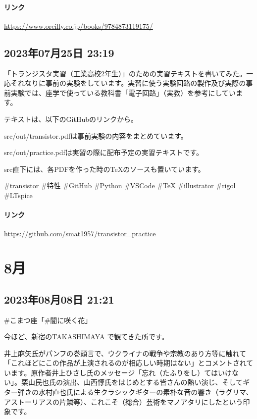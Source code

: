\documentclass[facebook_diary.tex]{subfiles}
\begin{document}
\paragraph{リンク}
\url{https://www.oreilly.co.jp/books/9784873119175/}

\subsection*{2023年07月25日 23:19}

「トランジスタ実習（工業高校2年生）」のための実習テキストを書いてみた。一応それなりに事前の実験をしています。実習に使う実験回路の製作及び実際の事前実験では、座学で使っている教科書「電子回路」（実教）を参考にしています。


テキストは、以下のGitHubのリンクから。


src/out/transistor.pdfは事前実験の内容をまとめています。

src/out/practice.pdfは実習の際に配布予定の実習テキストです。

src直下には、各PDFを作った時のTeXのソースも置いています。


\#transistor \#特性 \#GitHub \#Python \#VSCode \#TeX \#illustrator \#rigol \#LTspice

\paragraph{リンク}
\url{https://github.com/smat1957/transistor_practice}

\section{8月}

\subsection*{2023年08月08日 21:21}

\#こまつ座「\#闇に咲く花」


今ほど、新宿のTAKASHIMAYA で観てきた所です。

井上麻矢氏がパンフの巻頭言で、ウクライナの戦争や宗教のあり方等に触れて「これほどにこの作品が上演されるのが相応しい時期はない」とコメントされています。原作者井上ひさし氏のメッセージ「忘れ（たふりをし）てはいけない」。栗山民也氏の演出、山西惇氏をはじめとする皆さんの熱い演じ、そしてギター弾きの水村直也氏による生クラシックギターの素朴な音の響き（ラグリマ、アストーリアスの片鱗等）、これこそ（総合）芸術をマノアタリにしたという印象です。
\end{document}
